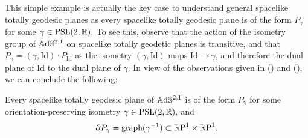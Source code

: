 This simple example is actually the key case to understand general spacelike totally geodesic planes as every spacelike totally geodesic plane is of the form $P_\gamma$ for some $\gamma\in\text{PSL}(2,\mathbb{R}).$ To see this, observe that the action of the isometry group of $\mathbb{A}\mathrm{d}\mathbb{S}^{2,1}$ on spacelike totally geodetic planes is transitive, and that $P_\gamma=(\gamma,\text{Id})\cdot P_{\text{Id}}$ as the isometry $(\gamma,\text{Id})$ maps $\text{Id}\to\gamma$, and therefore the dual plane of $\text{Id}$ to the dual plane of $\gamma.$ In view of the observations given in () and (), we can conclude the following: 
\begin{lemma}\label{32}
    Every spacelike totally geodesic plane of $\mathbb{A}\mathrm{d}\mathbb{S}^{2,1}$ is of the form $P_\gamma$ for some orientation-preserving isometry $\gamma\in\text{PSL}(2,\mathbb{R}),$ and 
    \[
        \partial P_\gamma=\text{graph}(\gamma^{-1})\subset\mathbb{R}\text{P}^1\times\mathbb{R}\text{P}^1.
    \]
\end{lemma}
